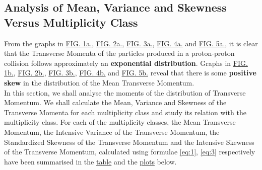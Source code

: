 \documentclass[letterpaper,aps,prc,superscriptaddress,nofootinbib,10pt,showpacs,floatfix]{revtex4-2}%
\begin{document}
\subsection{Analysis of Mean, Variance and Skewness Versus Multiplicity Class}
From the graphs in \hyperref[Fig:1a]{FIG. 1a.}, \hyperref[Fig:2a]{FIG. 2a.}, \hyperref[Fig:3a]{FIG. 3a.}, \hyperref[Fig:4a]{FIG. 4a.} and \hyperref[Fig:5a]{FIG. 5a.}, it is clear that the Transverse Momenta of the particles produced in a proton-proton collision follows approximately an \textbf{exponential distribution}. Graphs in \hyperref[Fig:1b]{FIG. 1b.}, \hyperref[Fig:2b]{FIG. 2b.}, \hyperref[Fig:3b]{FIG. 3b.}, \hyperref[Fig:4b]{FIG. 4b.} and \hyperref[Fig:5b]{FIG. 5b.} reveal that there is some \textbf{positive skew} in the distribution of the Mean Transverse Momentum.
\\
In this section, we shall analyse the moments of the distribution of Transverse Momentum. We shall calculate the Mean, Variance and Skewness of the Transverse Momenta for each multiplicity class and study its relation with the multiplicity class. For each of the multiplicity classes, the Mean Transverse Momentum, the Intensive Variance of the Transverse Momentum, the Standardized Skewness of the Transverse Momentum and the Intensive Skewness of the Transverse Momentum, calculated using formulae \ref{eq:1}, \ref{eq:3} respectively have been summarised in the \hyperref[subsubsec:summary]{table} and the \hyperref[subsubsec:mean]{plots} below.

\newpage
\end{document}
